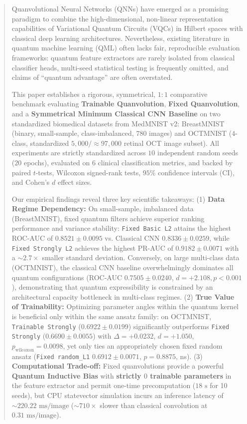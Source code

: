 \documentclass[runningheads]{llncs}
\begin{document}
\begin{abstract}
Quanvolutional Neural Networks (QNNs) have emerged as a promising paradigm to combine the high-dimensional, non-linear representation capabilities of Variational Quantum Circuits (VQCs) in Hilbert spaces with classical deep learning architectures. Nevertheless, existing literature in quantum machine learning (QML) often lacks fair, reproducible evaluation frameworks: quantum feature extractors are rarely isolated from classical classifier heads, multi-seed statistical testing is frequently omitted, and claims of ``quantum advantage'' are often overstated.

This paper establishes a rigorous, symmetrical, $1:1$ comparative benchmark evaluating \textbf{Trainable Quanvolution}, \textbf{Fixed Quanvolution}, and a \textbf{Symmetrical Minimum Classical CNN Baseline} on two standardized biomedical datasets from MedMNIST v2: BreastMNIST (binary, small-sample, class-imbalanced, $780$ images) and OCTMNIST ($4$-class, standardized $5{,}000 / \approx 97{,}000$ retinal OCT image subset). All experiments are strictly standardized across $10$ independent random seeds ($20$ epochs), evaluated on $6$ clinical classification metrics, and backed by paired $t$-tests, Wilcoxon signed-rank tests, $95\%$ confidence intervals (CI), and Cohen's $d$ effect sizes.

Our empirical findings reveal three key scientific takeaways:
(1) \textbf{Data Regime Dependency:} On small-sample, imbalanced data (BreastMNIST), fixed quantum filters achieve superior ranking performance and variance stability: \texttt{Fixed Basic L2} attains the highest ROC-AUC of $\mathbf{0.8521 \pm 0.0095}$ vs. Classical CNN $0.8336 \pm 0.0259$, while \texttt{Fixed Strongly L2} achieves the highest PR-AUC of $\mathbf{0.9182 \pm 0.0071}$ with a $\sim 2.7\times$ smaller standard deviation. Conversely, on large multi-class data (OCTMNIST), the classical CNN baseline overwhelmingly dominates all quantum configurations (ROC-AUC $\mathbf{0.7505 \pm 0.0240}$, $d = +2.108, p < 0.001$), demonstrating that quantum expressibility is constrained by an architectural capacity bottleneck in multi-class regimes.
(2) \textbf{True Value of Trainability:} Optimizing parameter angles within the quantum kernel is beneficial only within the same ansatz family: on OCTMNIST, \texttt{Trainable Strongly} ($0.6922 \pm 0.0199$) significantly outperforms \texttt{Fixed Strongly} ($0.6690 \pm 0.0055$) with $\Delta = +0.0232$, $d = +1.050$, $p_{\text{wilcoxon}} = 0.0098$, yet only ties an appropriately chosen fixed random ansatz (\texttt{Fixed random\_L1} $0.6912 \pm 0.0071$, $p = 0.8875$, ns).
(3) \textbf{Computational Trade-off:} Fixed quanvolutions provide a powerful \textbf{Quantum Inductive Bias} with \textbf{strictly $0$ trainable parameters} in the feature extractor and permit one-time precomputation ($18\text{ s}$ for 10 seeds), but CPU statevector simulation incurs an inference latency of $\sim 220.22\text{ ms/image}$ ($\sim 710\times$ slower than classical convolution at $0.31\text{ ms/image}$).


\end{abstract}
\end{document}
